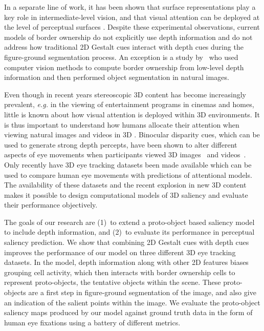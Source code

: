 \documentclass[12pt]{article}
\newcommand{\eg}[0]{{\em e.g.}\xspace}
\newcommand{\etal}[0]{{\em et al.}\xspace}
\begin{document}
In a separate line of work, it has been shown that surface
representations play a key role in intermediate-level vision, and that
visual attention can be deployed at the level of perceptual surfaces
\citep[][for a model of attention to surfaces see
Hu \etal 2015]{He_Nakayama92,He_Nakayama95}.
\nocite{Hu_etal15a}
Despite these experimental observations, current models of border
ownership do not explicitly use depth information and do not address
how traditional 2D Gestalt cues interact with depth cues during the
figure-ground segmentation process. An exception is a study
by~\cite{Mishra_etal12} who used computer vision methods to compute
border ownership from low-level depth information and then performed
object segmentation in natural images.

Even though in recent years stereoscopic 3D content has become
increasingly prevalent, \eg in the viewing of entertainment programs
in cinemas and homes, little is known about how visual attention is
deployed within 3D environments.  It is thus important to understand
how humans allocate their attention when viewing natural images and
videos in 3D \citep{LeCallet_Niebur13}.
Binocular disparity cues, which can be used to
generate strong depth percepts, have been shown to alter different
aspects of eye movements when participants viewed 3D images~\citep{Jansen_etal09} and videos~\citep{Huynh_Schiatti11}. Only recently have 3D eye tracking datasets been made available which can be used to compare human eye movements with
predictions of attentional models.  The availability of these datasets
and the recent explosion in new 3D content makes it possible to design
computational models of 3D saliency and evaluate their performance
objectively.

The goals of our research are (1)~to extend a proto-object based
saliency model \citep{Russell_etal14} to include depth information,
and (2)~to evaluate its performance in perceptual saliency
prediction. We show that combining 2D Gestalt cues with depth cues
improves the performance of our model on three different 3D eye
tracking datasets. In the model, depth information along with other 2D
features biases grouping cell activity, which then interacts with
border ownership cells to represent proto-objects, the tentative
objects within the scene. These proto-objects are a first step in
figure-ground segmentation of the image, and also give an indication
of the salient points within the image. We evaluate the proto-object
saliency maps produced by our model against ground truth data in the
form of human eye fixations using a battery of different metrics.
\end{document}
